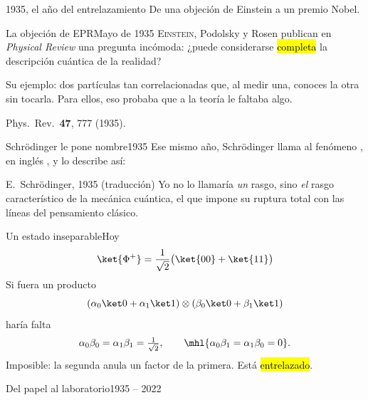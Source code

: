 \documentclass[12pt]{beamer}
\begin{document}
  {1935, el año del entrelazamiento}
  {De una objeción de Einstein a un premio Nobel.}

\begin{frame}{La objeción de EPR}{Mayo de 1935}
\lettrine{E}{instein}, Podolsky y Rosen publican en \emph{Physical Review}
una pregunta incómoda: ¿puede considerarse \hl{completa} la descripción
cuántica de la realidad?

Su ejemplo: dos partículas tan correlacionadas que, al medir una, conoces
la otra sin tocarla. Para ellos, eso probaba que a la teoría le faltaba
algo.
\vfill
{\footnotesize\color{igMuted}Phys.\ Rev.\ \textbf{47}, 777 (1935).\par}
\end{frame}

\begin{frame}{Schrödinger le pone nombre}{1935}
Ese mismo año, Schrödinger llama al fenómeno , en
inglés , y lo describe así:
\begin{pullquote}{E.~Schrödinger, 1935 (traducción)}
Yo no lo llamaría \emph{un} rasgo, sino \emph{el} rasgo característico de
la mecánica cuántica, el que impone su ruptura total con las líneas del
pensamiento clásico.
\end{pullquote}
\end{frame}

\begin{frame}{Un estado inseparable}{Hoy}
\[
  \ket{\Phi^+} = \frac{1}{\sqrt2}\big(\ket{00} + \ket{11}\big)
\]
Si fuera un producto
\[
  (\alpha_0\ket0+\alpha_1\ket1)\otimes(\beta_0\ket0+\beta_1\ket1)
\]
haría falta
\[
  \alpha_0\beta_0 = \alpha_1\beta_1 = \tfrac{1}{\sqrt2},
  \qquad
  \mhl{\alpha_0\beta_1 = \alpha_1\beta_0 = 0}.
\]
Imposible: la segunda anula un factor de la primera. Está \hl{entrelazado}.
\end{frame}

\begin{frame}{Del papel al laboratorio}{1935 -- 2022}
\begin{center}
\end{center}
\end{frame}
\end{document}
